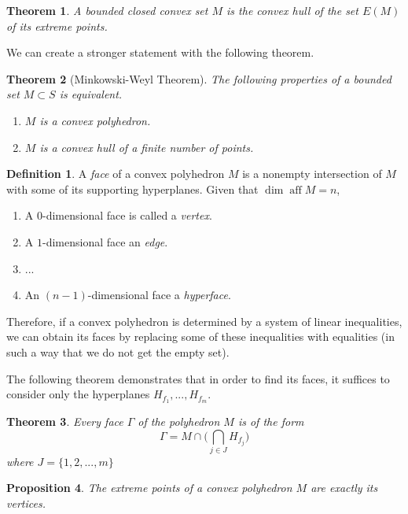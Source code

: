\documentclass{article}
\DeclareMathOperator{\aff}{aff}
\newtheorem{theorem}{Theorem}[section]
\newtheorem{proposition}[theorem]{Proposition}
\theoremstyle{remark}
\theoremstyle{definition}
\newtheorem{definition}{Definition}[section]
\begin{document}
\begin{theorem}
A bounded closed convex set $M$ is the convex hull of the set $E(M)$ of its extreme points. 
\end{theorem}

We can create a stronger statement with the following theorem. 

\begin{theorem}[Minkowski-Weyl Theorem]
The following properties of a bounded set $M \subset S$ is equivalent.
\begin{enumerate}
    \item $M$ is a convex polyhedron. 
    \item $M$ is a convex hull of a finite number of points. 
\end{enumerate}
\end{theorem}

\begin{definition}
A \textit{face} of a convex polyhedron $M$ is a nonempty intersection of $M$ with some of its supporting hyperplanes. Given that $\dim \aff M = n$, 
\begin{enumerate}
    \item A $0$-dimensional face is called a \textit{vertex}. 
    \item A $1$-dimensional face an \textit{edge}. 
    \item ...
    \item An $(n-1)$-dimensional face a \textit{hyperface}. 
\end{enumerate}
\end{definition}

Therefore, if a convex polyhedron is determined by a system of linear inequalities, we can obtain its faces by replacing some of these inequalities with equalities (in such a way that we do not get the empty set). 

The following theorem demonstrates that in order to find its faces, it suffices to consider only the hyperplanes $H_{f_1}, ..., H_{f_m}$. 

\begin{theorem}
Every face $\Gamma$ of the polyhedron $M$ is of the form
\[\Gamma = M \cap \bigg( \bigcap_{j \in J} H_{f_j} \bigg)\]
where $J = \{1, 2, ..., m\}$
\end{theorem}

\begin{proposition}
The extreme points of a convex polyhedron $M$ are exactly its vertices. 
\end{proposition}
\end{document}
